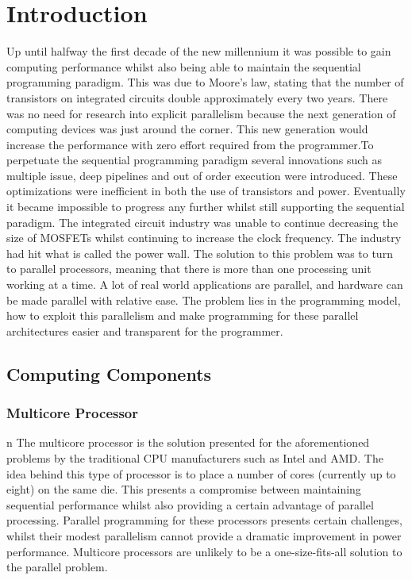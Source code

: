 



\chapter{Introduction} 
Up until halfway the first decade of the new millennium it was possible to gain computing performance whilst also being able to maintain the sequential programming paradigm. This was due to Moore's law, stating that the number of transistors on integrated circuits double approximately every two years. There was no need for research into explicit parallelism because the next generation of computing devices was just around the corner. This new generation would increase the performance with zero effort required from the programmer.To perpetuate the sequential programming paradigm several innovations such as multiple issue, deep pipelines and out of order execution were introduced. These optimizations  were inefficient in both the use of transistors and power. Eventually it became impossible to progress any further whilst still supporting the sequential paradigm. The integrated circuit industry was unable to continue decreasing the size of MOSFETs whilst continuing to increase the clock frequency. The industry had hit what is called the power wall.
The solution to this problem was to turn to parallel processors, meaning that there is more than one processing unit working at a time. A lot of real world applications are parallel, and hardware can be made parallel with relative ease. The problem lies in the programming model, how to exploit this parallelism and make programming for these parallel architectures easier and transparent for the programmer.

\newpage

\section{Computing Components}

\subsection{Multicore Processor}n  
The multicore processor is the solution presented for the aforementioned problems by the traditional CPU manufacturers such as Intel and AMD. The idea behind this type of processor is to place a number of cores (currently up to eight) on the same die. This presents a compromise between maintaining sequential performance whilst also providing a certain advantage of parallel processing. Parallel programming for these processors presents certain challenges, whilst their modest parallelism cannot provide a dramatic improvement in power performance. Multicore processors are unlikely to be a one-size-fits-all solution to the parallel problem.\cite{asanovic_landscape_????}

